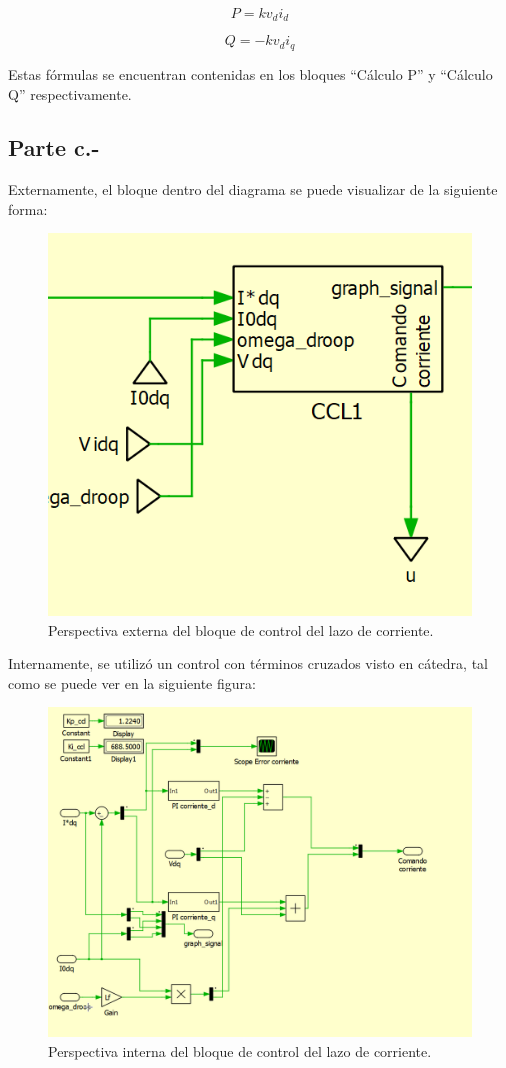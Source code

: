 \begin{equation}
    P = kv_{d}i_{d}
\end{equation}

\begin{equation}
    Q = -kv_{d}i_{q}
\end{equation}

Estas fórmulas se encuentran contenidas en los bloques ``Cálculo P'' y ``Cálculo Q'' respectivamente.

\subsection{Parte c.-}

Externamente, el bloque dentro del diagrama se puede visualizar de la siguiente forma:

\begin{figure}
   \centering
   \includegraphics[width=0.5\linewidth]{Tarea 1/report/imagenes/p1c/ccl bloque externo.png}
   \caption{Perspectiva externa del bloque de control del lazo de corriente.}
   \label{ccl externo}
\end{figure}

Internamente, se utilizó un control con términos cruzados visto en cátedra, tal como se puede ver en la siguiente figura:

\begin{figure}
   \centering
   \includegraphics[width=0.5\linewidth]{Tarea 1/report/imagenes/p1c/ccl bloque interno.png}
   \caption{Perspectiva interna del bloque de control del lazo de corriente.}
   \label{ccl interno}
\end{figure}

